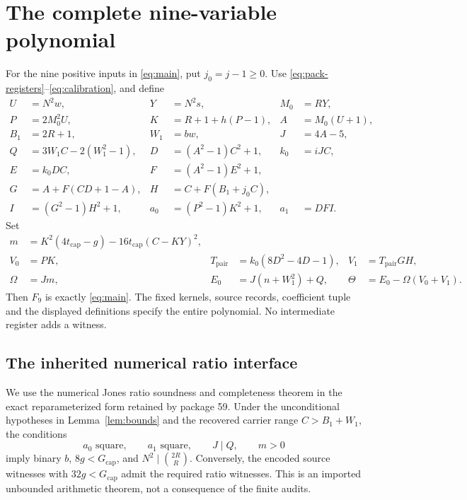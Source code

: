 \documentclass[11pt,a4paper]{article}
\theoremstyle{remark}
\newcommand{\Gcap}{G_{\mathrm{cap}}}
\begin{document}
\section{The complete nine-variable polynomial}
\label{sec:tail}

For the nine positive inputs in \eqref{eq:main}, put \(j_0=j-1\ge0\).
Use \eqref{eq:pack-registers}--\eqref{eq:calibration}, and define
\begin{align}
 U&=N^2w,&Y&=N^2s,&M_0&=RY,\nonumber\\
 P&=2M_0^2U,&K&=R+1+h(P-1),&A&=M_0(U+1),\nonumber\\
 B_1&=2R+1,&W_1&=bw,&J&=4A-5,\nonumber\\
 Q&=3W_1C-2(W_1^2-1),&
 D&=(A^2-1)C^2+1,&k_0&=iJC,\nonumber\\
 E&=k_0DC,&F&=(A^2-1)E^2+1,\nonumber\\
 G&=A+F(CD+1-A),&
 H&=C+F(B_1+j_0C),\nonumber\\
 I&=(G^2-1)H^2+1,&
 a_0&=(P^2-1)K^2+1,&a_1&=DFI.
\label{eq:tail-registers}
\end{align}
Set
\begin{align}
 m&=K^2(4t_{\mathrm{cap}}-g)
       -16t_{\mathrm{cap}}(C-KY)^2,\nonumber\\
 V_0&=PK,&T_{\mathrm{pair}}&=k_0(8D^2-4D-1),&
 V_1&=T_{\mathrm{pair}}GH,\nonumber\\
 \Omega&=Jm,&E_0&=J(n+W_1^2)+Q,&
 \Theta&=E_0-\Omega(V_0+V_1).
\label{eq:norm-registers}
\end{align}
Then \(F_9\) is exactly \eqref{eq:main}. The fixed kernels, source
records, coefficient tuple and the displayed definitions specify
the entire polynomial. No intermediate register adds a witness.

\subsection{The inherited numerical ratio interface}

We use the numerical Jones ratio soundness and completeness theorem
in the exact reparameterized form retained by package 59.
Under the unconditional hypotheses in Lemma~\ref{lem:bounds}
and the recovered carrier range \(C>B_1+W_1\), the conditions
\[
 a_0\text{ square},\qquad a_1\text{ square},\qquad J\mid Q,\qquad m>0
\]
imply binary \(b\), \(8g<\Gcap\), and
\(N^2\mid\binom{2R}{R}\). Conversely, the encoded source witnesses
with \(32g<\Gcap\) admit the required ratio witnesses.
This is an imported unbounded arithmetic theorem, not a consequence
of the finite audits.
\end{document}
